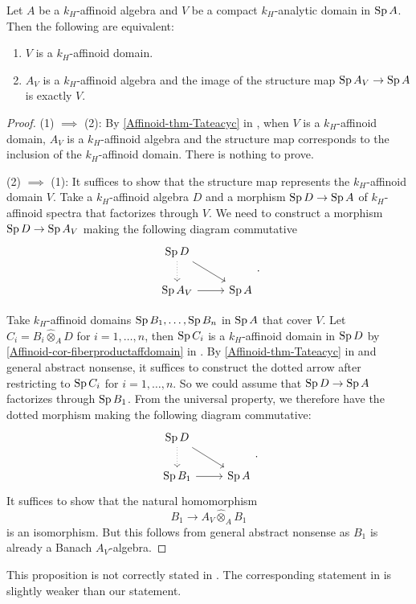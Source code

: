 \begin{proposition}\label{prop-compactanalydomainaffinoid}
    Let $A$ be a $k_H$-affinoid algebra and $V$ be a compact $k_H$-analytic domain in $\operatorname{Sp} A$. Then the following are equivalent:
    \begin{enumerate}
        \item $V$ is a $k_H$-affinoid domain.
        \item $A_V$ is a $k_H$-affinoid algebra and the image of the structure map $\operatorname{Sp} A_V\rightarrow \operatorname{Sp} A$ is exactly $V$.
    \end{enumerate}
\end{proposition}
\begin{proof}
    (1) $\implies$ (2): By \cref{Affinoid-thm-Tateacyc} in , when $V$ is a $k_H$-affinoid domain, $A_V$ is a $k_H$-affinoid algebra and the structure map corresponds to the inclusion of the $k_H$-affinoid domain. There is nothing to prove.

    (2) $\implies$ (1): It suffices to show that the structure map represents the $k_H$-affinoid domain $V$. Take a $k_H$-affinoid algebra $D$ and a morphism $\operatorname{Sp} D\rightarrow \operatorname{Sp} A$ of $k_H$-affinoid spectra that factorizes through $V$. We need to construct a morphism $\operatorname{Sp} D\rightarrow \operatorname{Sp} A_V$ making the following diagram commutative
    \[
        \begin{tikzcd}
            \Sp D \arrow[rd] \arrow[d, dotted] &       \\
            \Sp A_V \arrow[r]                  & \Sp A
        \end{tikzcd}.    
    \]
    
    Take $k_H$-affinoid domains $\operatorname{Sp} B_1,\ldots,\operatorname{Sp} B_n$ in $\operatorname{Sp} A$ that cover $V$. Let $C_i=B_i\hat{\otimes}_A D$ for $i=1,\ldots,n$, then $\operatorname{Sp} C_i$ is a $k_H$-affinoid domain in $\operatorname{Sp} D$ by \cref{Affinoid-cor-fiberproductaffdomain} in . By \cref{Affinoid-thm-Tateacyc} in  and general abstract nonsense, it suffices to construct the dotted arrow after restricting to $\operatorname{Sp} C_i$ for $i=1,\ldots,n$. So we could assume that $\operatorname{Sp} D\rightarrow \operatorname{Sp} A$ factorizes through $\operatorname{Sp} B_1$. From the universal property, we therefore have the dotted morphism making the following diagram commutative:
    \[
        \begin{tikzcd}
            \Sp D \arrow[rd] \arrow[d, dotted] &       \\
            \Sp B_1 \arrow[r]                  & \Sp A
        \end{tikzcd}.    
    \]
    It suffices to show that the natural homomorphism
    \[
        B_1\rightarrow A_V\hat{\otimes}_A B_1  
    \]
    is an isomorphism. But this follows from general abstract nonsense as $B_1$ is already a Banach $A_V$-algebra.
\end{proof}
\begin{remark}
    This proposition is not correctly stated in \cite[Corollary~2.2.6]{Berk12}. The corresponding statement in \cite[Remark~1.2.1]{Berk93} is slightly weaker than our statement.
\end{remark}




